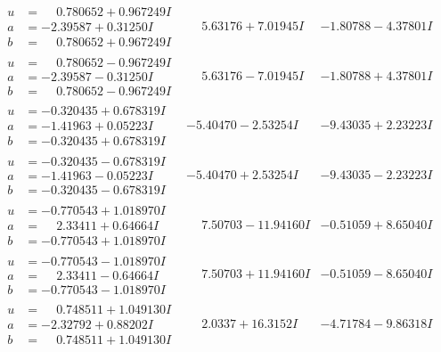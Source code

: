 \documentclass[1p]{elsarticle_modified}
\theoremstyle{definition}
\begin{document}
$$\begin{array}{c|c|c}
\begin{aligned}
u &= \phantom{-}0.780652 + 0.967249 I \\
a &= -2.39587 + 0.31250 I \\
b &= \phantom{-}0.780652 + 0.967249 I\end{aligned}
 & \phantom{-}5.63176 + 7.01945 I & -1.80788 - 4.37801 I \\ \hline\begin{aligned}
u &= \phantom{-}0.780652 - 0.967249 I \\
a &= -2.39587 - 0.31250 I \\
b &= \phantom{-}0.780652 - 0.967249 I\end{aligned}
 & \phantom{-}5.63176 - 7.01945 I & -1.80788 + 4.37801 I \\ \hline\begin{aligned}
u &= -0.320435 + 0.678319 I \\
a &= -1.41963 + 0.05223 I \\
b &= -0.320435 + 0.678319 I\end{aligned}
 & -5.40470 - 2.53254 I & -9.43035 + 2.23223 I \\ \hline\begin{aligned}
u &= -0.320435 - 0.678319 I \\
a &= -1.41963 - 0.05223 I \\
b &= -0.320435 - 0.678319 I\end{aligned}
 & -5.40470 + 2.53254 I & -9.43035 - 2.23223 I \\ \hline\begin{aligned}
u &= -0.770543 + 1.018970 I \\
a &= \phantom{-}2.33411 + 0.64664 I \\
b &= -0.770543 + 1.018970 I\end{aligned}
 & \phantom{-}7.50703 - 11.94160 I & -0.51059 + 8.65040 I \\ \hline\begin{aligned}
u &= -0.770543 - 1.018970 I \\
a &= \phantom{-}2.33411 - 0.64664 I \\
b &= -0.770543 - 1.018970 I\end{aligned}
 & \phantom{-}7.50703 + 11.94160 I & -0.51059 - 8.65040 I \\ \hline\begin{aligned}
u &= \phantom{-}0.748511 + 1.049130 I \\
a &= -2.32792 + 0.88202 I \\
b &= \phantom{-}0.748511 + 1.049130 I\end{aligned}
 & \phantom{-}2.0337 + 16.3152 I & -4.71784 - 9.86318 I \\ \hline\begin{aligned}

\end{aligned}
\end{array}$$
\end{document}
